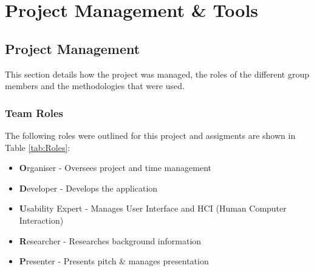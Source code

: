 \section{Project Management \& Tools}

\subsection{Project Management}
This section details how the project was managed, the roles of the different group members and the methodologies that were used.

\subsubsection{Team Roles}
The following roles were outlined for this project and assigments are shown in Table \ref{tab:Roles}:

\begin{itemize}[noitemsep,leftmargin=1cm]
	\item{\textbf{O}rganiser - Oversees project and time management}
	\item{\textbf{D}eveloper - Develops the application}
	\item{\textbf{U}sability Expert - Manages User Interface and HCI (Human Computer Interaction)}
	\item{\textbf{R}esearcher - Researches background information}
	\item{\textbf{P}resenter - Presents pitch \& manages presentation}
\end{itemize}


